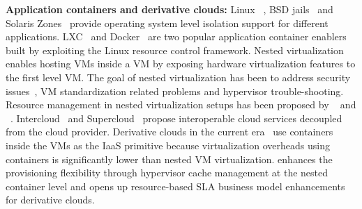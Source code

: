 \noindent
{\bf Application containers and derivative clouds:} Linux \cgroups~\cite{cgroup},
BSD jails~\cite{jail} and Solaris Zones~\cite{zone} provide operating system 
level isolation support for different applications.
%  
LXC~\cite{lxc} and Docker~\cite{docker} are two popular application container
enablers built by exploiting the Linux \cgroup{} resource control framework.
%
Nested virtualization~\cite{turtle,blanket,recursv} enables hosting VMs inside a VM
by exposing hardware virtualization features to the first level VM.
%
The goal of nested virtualization has been to address security issues~\cite{vx32},
VM standardization related problems and hypervisor trouble-shooting. 
%
Resource management in nested virtualization setups has been proposed 
by ~\cite{intercloud} and ~\cite{supercloud}.
%
Intercloud~\cite{intercloud} and Supercloud~\cite{supercloud} propose 
interoperable 
cloud services 
decoupled from the cloud provider. 
%
Derivative clouds in the current era~\cite{spotcheck, heroku, picloud} use 
containers inside the VMs as the IaaS primitive because virtualization 
overheads using containers is significantly lower than 
nested VM virtualization.
%
\dd{} enhances the provisioning flexibility through hypervisor cache management
at the nested container level and opens up resource-based SLA
business model enhancements for 
derivative clouds.


